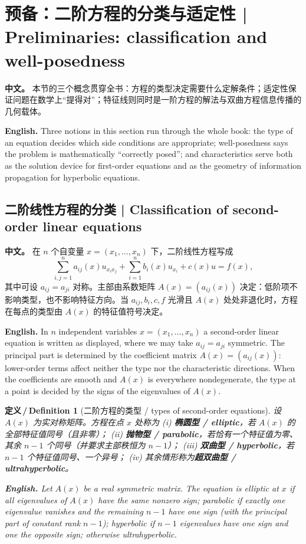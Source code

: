 \documentclass[UTF8,11pt,a4paper]{ctexart}
\newcommand{\APS}[2]{\par\noindent\textbf{中文。} #1\par\noindent\textbf{English.} #2\par\smallskip}
\newcommand{\EN}[1]{\par\noindent \textbf{English.} #1\par}
\newtheorem{definition}{定义\,/\,Definition}[section]
\begin{document}
\section{预备：二阶方程的分类与适定性 | Preliminaries: classification and well-posedness}
\APS{本节的三个概念贯穿全书：方程的类型决定需要什么定解条件；适定性保证问题在数学上``提得对''；特征线则同时是一阶方程的解法与双曲方程信息传播的几何载体。}{Three notions in this section run through the whole book: the type of an equation decides which side conditions are appropriate; well-posedness says the problem is mathematically ``correctly posed''; and characteristics serve both as the solution device for first-order equations and as the geometry of information propagation for hyperbolic equations.}

\subsection{二阶线性方程的分类 | Classification of second-order linear equations}
\APS{在 $n$ 个自变量 $x=(x_1,\dots,x_n)$ 下，二阶线性方程写成
\[
\sum_{i,j=1}^{n}a_{ij}(x)u_{x_ix_j}+\sum_{i=1}^{n}b_i(x)u_{x_i}+c(x)u=f(x),
\]
其中可设 $a_{ij}=a_{ji}$ 对称。主部由系数矩阵 $A(x)=(a_{ij}(x))$ 决定：低阶项不影响类型，也不影响特征方向。当 $a_{ij},b_i,c,f$ 光滑且 $A(x)$ 处处非退化时，方程在每点的类型由 $A(x)$ 的特征值符号决定。}{In $n$ independent variables $x=(x_1,\dots,x_n)$ a second-order linear equation is written as displayed, where we may take $a_{ij}=a_{ji}$ symmetric. The principal part is determined by the coefficient matrix $A(x)=(a_{ij}(x))$: lower-order terms affect neither the type nor the characteristic directions. When the coefficients are smooth and $A(x)$ is everywhere nondegenerate, the type at a point is decided by the signs of the eigenvalues of $A(x)$.}

\begin{definition}[二阶方程的类型 / types of second-order equations]\label{def:type}
设 $A(x)$ 为实对称矩阵。方程在点 $x$ 处称为
(i) \textbf{椭圆型 / elliptic}，若 $A(x)$ 的全部特征值同号（且非零）；
(ii) \textbf{抛物型 / parabolic}，若恰有一个特征值为零、其余 $n-1$ 个同号（并要求主部秩恒为 $n-1$）；
(iii) \textbf{双曲型 / hyperbolic}，若 $n-1$ 个特征值同号、一个异号；
(iv) 其余情形称为\textbf{超双曲型 / ultrahyperbolic}。
\EN{Let $A(x)$ be a real symmetric matrix. The equation is elliptic at $x$ if all eigenvalues of $A(x)$ have the same nonzero sign; parabolic if exactly one eigenvalue vanishes and the remaining $n-1$ have one sign (with the principal part of constant rank $n-1$); hyperbolic if $n-1$ eigenvalues have one sign and one the opposite sign; otherwise ultrahyperbolic.}
\end{definition}
\end{document}
